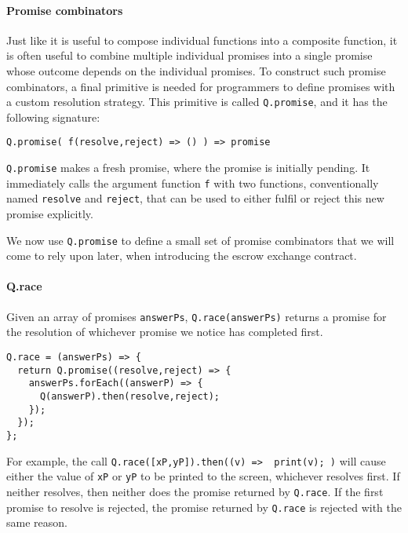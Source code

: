 \documentclass{llncs}
\begin{document}
\paragraph{Promise combinators}

Just like it is useful to compose individual functions into a composite function, it is often useful to combine multiple individual promises into a single promise whose outcome depends on the individual promises. To construct such promise combinators, a final primitive is needed for programmers to define promises with a custom resolution strategy. This primitive is called \texttt{Q.promise}, and it has the following signature:

\begin{verbatim}
Q.promise( f(resolve,reject) => () ) => promise
\end{verbatim}

\texttt{Q.promise} makes a fresh promise, where the promise is initially pending. It immediately calls the argument function \texttt{f} with two functions, conventionally named \texttt{resolve} and \texttt{reject}, that can be used to either fulfil or reject this new promise explicitly.

We now use \texttt{Q.promise} to define a small set of promise combinators that we will come to rely upon later, when introducing the escrow exchange contract.

\paragraph{Q.race} Given an array of promises \texttt{answerPs}, \texttt{Q.race(answerPs)} returns a promise for the resolution of whichever promise we notice has completed first.

\begin{verbatim}
Q.race = (answerPs) => {
  return Q.promise((resolve,reject) => {
    answerPs.forEach((answerP) => {
      Q(answerP).then(resolve,reject);
    });
  });
};
\end{verbatim}

For example, the call \texttt{Q.race([xP,yP]).then((v) => { print(v); })} will cause either the value of \texttt{xP} or \texttt{yP} to be printed to the screen, whichever resolves first. If neither resolves, then neither does the promise returned by \texttt{Q.race}. If the first promise to resolve is rejected, the promise returned by \texttt{Q.race} is rejected with the same reason.
\end{document}
